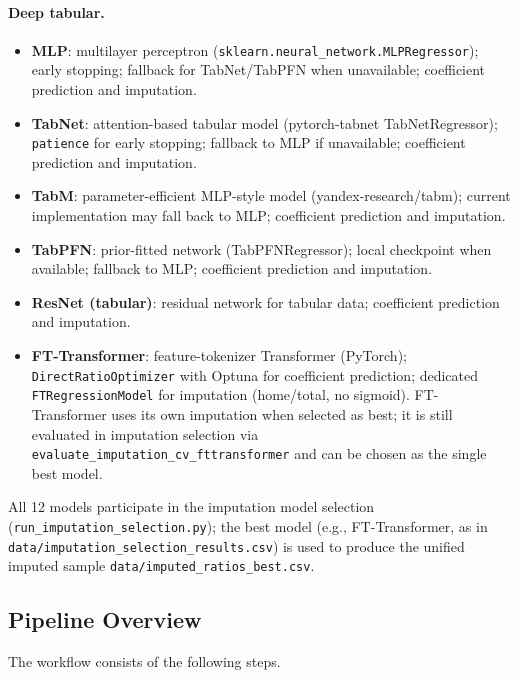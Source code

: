 \paragraph{Deep tabular.}
\begin{itemize}
  \item \textbf{MLP}: multilayer perceptron (\texttt{sklearn.neural\_network.MLPRegressor}); early stopping; fallback for TabNet/TabPFN when unavailable; coefficient prediction and imputation.
  \item \textbf{TabNet}: attention-based tabular model (pytorch-tabnet TabNetRegressor); \texttt{patience} for early stopping; fallback to MLP if unavailable; coefficient prediction and imputation.
  \item \textbf{TabM}: parameter-efficient MLP-style model (yandex-research/tabm); current implementation may fall back to MLP; coefficient prediction and imputation.
  \item \textbf{TabPFN}: prior-fitted network (TabPFNRegressor); local checkpoint when available; fallback to MLP; coefficient prediction and imputation.
  \item \textbf{ResNet (tabular)}: residual network for tabular data; coefficient prediction and imputation.
  \item \textbf{FT-Transformer}: feature-tokenizer Transformer (PyTorch); \texttt{DirectRatioOptimizer} with Optuna for coefficient prediction; dedicated \texttt{FTRegressionModel} for imputation (home/total, no sigmoid). FT-Transformer uses its own imputation when selected as best; it is still evaluated in imputation selection via \texttt{evaluate\_imputation\_cv\_fttransformer} and can be chosen as the single best model.
\end{itemize}

All 12 models participate in the imputation model selection (\texttt{run\_imputation\_selection.py}); the best model (e.g., FT-Transformer, as in \texttt{data/imputation\_selection\_results.csv}) is used to produce the unified imputed sample \texttt{data/imputed\_ratios\_best.csv}.

\subsection{Pipeline Overview}
\label{sec:pipeline}

The workflow consists of the following steps.

